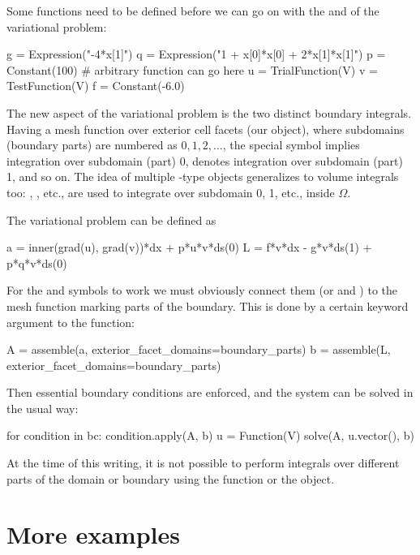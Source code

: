 Some functions need to be defined before we can go on with the
 and  of the variational problem:
\begin{python}
g = Expression("-4*x[1]")
q = Expression("1 + x[0]*x[0] + 2*x[1]*x[1]")
p = Constant(100)  # arbitrary function can go here
u = TrialFunction(V)
v = TestFunction(V)
f = Constant(-6.0)
\end{python}

The new aspect of the variational problem is the two distinct
boundary integrals.
Having a mesh function over exterior cell facets (our
 object), where subdomains (boundary parts) are
numbered as $0,1,2,\ldots$, the special symbol 
implies integration over subdomain (part) 0,  denotes
integration over subdomain (part) 1, and so on.
The idea of multiple -type objects generalizes to volume
integrals too: , , etc., are used to
integrate over subdomain 0, 1, etc.,  inside $\Omega$.

The variational problem can be defined as
\begin{python}
a = inner(grad(u), grad(v))*dx + p*u*v*ds(0)
L = f*v*dx - g*v*ds(1) + p*q*v*ds(0)
\end{python}
For the  and  symbols to work we must obviously
connect them (or  and ) to the mesh function marking
parts of the boundary. This is done by a certain keyword argument
to the  function:
\begin{python}
A = assemble(a, exterior_facet_domains=boundary_parts)
b = assemble(L, exterior_facet_domains=boundary_parts)
\end{python}
Then essential boundary conditions are enforced, and the system can
be solved in the usual way:
\begin{python}
for condition in bc: condition.apply(A, b)
u = Function(V)
solve(A, u.vector(), b)
\end{python}

At the time of this writing, it is not possible to perform integrals
over different parts of the domain or boundary using the
 function or the
 object.

\section{More examples}

